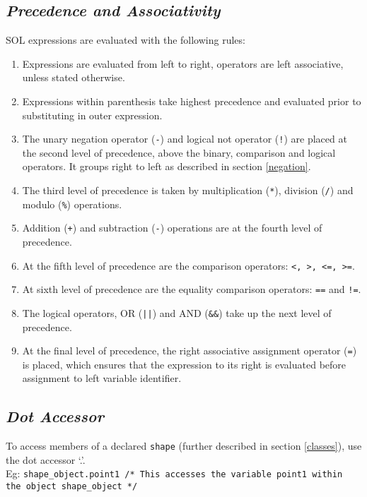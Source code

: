     \subsection{\textit{Precedence and Associativity}} \label{precedence}
    SOL expressions are evaluated with the following rules:
    \begin{enumerate}
        \itemsep0em
        \item Expressions are evaluated from left to right, operators are left associative, unless stated otherwise.

        \item Expressions within parenthesis take highest precedence and evaluated prior to substituting in outer expression.
        
        \item The unary negation operator (\texttt{-}) and logical not operator (\texttt{!}) are placed at the second level of precedence, above the binary, comparison and logical operators. It groups right to left as described in section \ref{negation}.
        
        \item The third level of precedence is taken by multiplication (\texttt{*}), division (\texttt{/}) and modulo (\texttt{\%}) operations.
        
        \item Addition (\texttt{+}) and subtraction (\texttt{-}) operations are at the fourth level of precedence.
        
        \item At the fifth level of precedence are the comparison operators: \texttt{\textless, \textgreater, \textless=, \textgreater=}.

        \item At sixth level of precedence are the equality comparison operators: \texttt{==} and \texttt{!=}.

        \item The logical operators, OR (\texttt{||}) and AND (\texttt{\&\&}) take up the next level of precedence.

        \item At the final level of precedence, the right associative assignment operator (\texttt{=}) is placed, which ensures that the expression to its right is evaluated before assignment to left variable identifier.

    \end{enumerate}
    
    \subsection{\textit{Dot Accessor}}
    To access members of a declared \texttt{shape} (further described in section \ref{classes}), use the dot accessor `.'. \\
    Eg: \texttt{shape\_object.point1 /* This accesses the variable point1 within the object shape\_object */}


